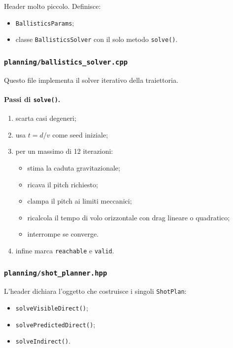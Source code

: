 \documentclass[11pt,a4paper]{article}
\newcommand{\code}[1]{\texttt{#1}}
\begin{document}
Header molto piccolo. Definisce:
\begin{itemize}[leftmargin=1.4em]
  \item \code{BallisticsParams};
  \item classe \code{BallisticsSolver} con il solo metodo \code{solve()}.
\end{itemize}

\subsubsection{\code{planning/ballistics\_solver.cpp}}

Questo file implementa il solver iterativo della traiettoria.

\paragraph{Passi di \code{solve()}.}
\begin{enumerate}[leftmargin=1.4em]
  \item scarta casi degeneri;
  \item usa \(t = d/v\) come seed iniziale;
  \item per un massimo di 12 iterazioni:
  \begin{itemize}[leftmargin=1.4em]
    \item stima la caduta gravitazionale;
    \item ricava il pitch richiesto;
    \item clampa il pitch ai limiti meccanici;
    \item ricalcola il tempo di volo orizzontale con drag lineare o quadratico;
    \item interrompe se converge.
  \end{itemize}
  \item infine marca \code{reachable} e \code{valid}.
\end{enumerate}

\subsubsection{\code{planning/shot\_planner.hpp}}

L'header dichiara l'oggetto che costruisce i singoli \code{ShotPlan}:
\begin{itemize}[leftmargin=1.4em]
  \item \code{solveVisibleDirect()};
  \item \code{solvePredictedDirect()};
  \item \code{solveIndirect()}.
\end{itemize}
\end{document}
